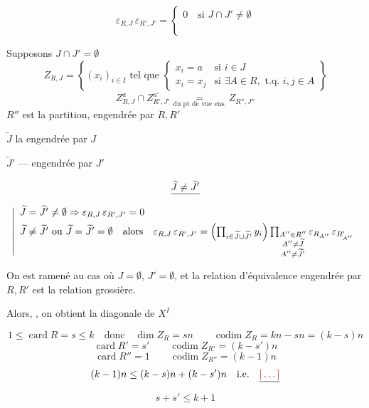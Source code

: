 \documentclass[11pt,a4paper]{article}
\begin{document}
\[
  \varepsilon_{R,J}\, \varepsilon_{R',J'} =
  \left\{
  \begin{array}{l}
    0 \quad \text{si } J \cap J' \neq \emptyset \\
    \phantom{0}
  \end{array}
  \right.
\]

Supposons $J \cap J' = \emptyset$
\[
  Z_{R,J} = \left\{ (x_{i})_{i \in I} \text{ tel que }
  \left\{
  \begin{array}{ll}
    x_{i} = a & \text{si } i \in J \\
    x_{i} = x_{j} & \text{si } \exists A \in R, \text{ t.q. } i, j \in A
  \end{array}
  \right.
  \right\}
\]
\[
  Z^{a}_{R,J} \cap Z^{a'}_{R',J'} \underset{\text{du pt de vue ens.}}{=} Z_{R'',J''}
\]
$R''$ est la partition, engendrée par $R, R'$

$\widetilde{J}$ la  \struck{\ill{}} engendrée par $J$

$\widetilde{J}'$ --- engendrée par $J'$

\[
  \struck{\widetilde{J} \neq \widetilde{J}'}
\]
\[
  \left|
  \begin{array}{l}
    \widetilde{J} = \widetilde{J}' \neq \emptyset \Rightarrow
    \varepsilon_{R,J}\, \varepsilon_{R',J'} = 0 \\[1ex]
    \widetilde{J} \neq \widetilde{J}' \text{ ou } \widetilde{J} = \widetilde{J}' = \emptyset
    \quad \text{alors} \quad
    \varepsilon_{R,J}\, \varepsilon_{R',J'} =
    \Bigl(\prod_{i \in \widetilde{J} \cup \widetilde{J}'} y_{i}\Bigr)
    \prod_{\substack{A'' \in R'' \\ A'' \neq \widetilde{J} \\ A'' \neq \widetilde{J}'}}
    \varepsilon_{R_{A''}}\, \varepsilon_{R'_{A''}}
  \end{array}
  \right.
\]

On est ramené au cas où $J = \emptyset$, $J' = \emptyset$, et la relation
d'équivalence engendrée par $R, R'$ est la relation grossière.

Alors, , on obtient la diagonale de $X^{I}$


\[
  1 \leq \operatorname{card} R = s \leq k \quad \text{donc} \quad
  \dim Z_{R} = sn \qquad \operatorname{codim} Z_{R} = kn - sn = (k-s)n
\]
\[
  \operatorname{card} R' = s' \qquad \operatorname{codim} Z_{R'} = (k-s')n
\]
\[
  \operatorname{card} R'' = 1 \qquad \operatorname{codim} Z_{R''} = (k-1)n
\]
\[
  (k-1)n \leq (k-s)n + (k-s')n \quad \text{i.e.} \quad \struck{\ill{}}
\]
\[
  \boxed{s + s' \leq k+1}
\]
\end{document}
